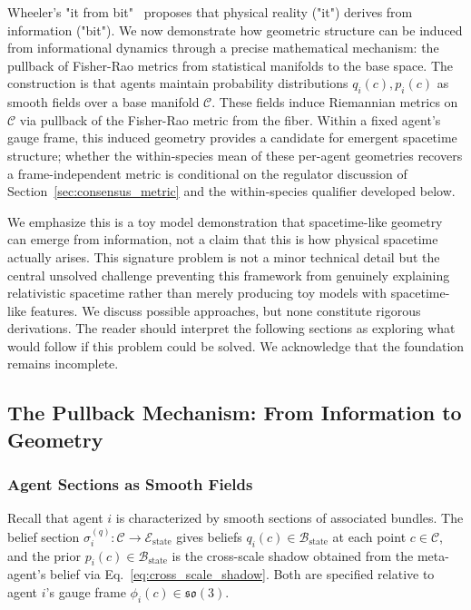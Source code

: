 \documentclass[11pt]{article}
\begin{document}
Wheeler's "it from bit"~\cite{Wheeler1990} proposes that physical reality ("it") derives from information ("bit"). We now demonstrate how geometric structure can be induced from informational dynamics through a precise mathematical mechanism: the pullback of Fisher-Rao metrics from statistical manifolds to the base space. The construction is that agents maintain probability distributions $q_i(c), p_i(c)$ as smooth fields over a base manifold $\mathcal{C}$. These fields induce Riemannian metrics on $\mathcal{C}$ via pullback of the Fisher-Rao metric from the fiber. Within a fixed agent's gauge frame, this induced geometry provides a candidate for emergent spacetime structure; whether the within-species mean of these per-agent geometries recovers a frame-independent metric is conditional on the regulator discussion of Section~\ref{sec:consensus_metric} and the within-species qualifier developed below.

We emphasize this is a toy model demonstration that spacetime-like geometry can emerge from information, not a claim that this is how physical spacetime actually arises. This signature problem is not a minor technical detail but the central unsolved challenge preventing this framework from genuinely explaining relativistic spacetime rather than merely producing toy models with spacetime-like features. We discuss possible approaches, but none constitute rigorous derivations. The reader should interpret the following sections as exploring what would follow if this problem could be solved. We acknowledge that the foundation remains incomplete.

\subsection{The Pullback Mechanism: From Information to Geometry}

\subsubsection{Agent Sections as Smooth Fields}

Recall that agent $i$ is characterized by smooth sections of associated bundles. The belief section $\sigma_i^{(q)}: \mathcal{C} \to \mathcal{E}_{\mathrm{state}}$ gives beliefs $q_i(c) \in \mathcal{B}_{\mathrm{state}}$ at each point $c \in \mathcal{C}$, and the prior $p_i(c) \in \mathcal{B}_{\mathrm{state}}$ is the cross-scale shadow obtained from the meta-agent's belief via Eq.~\eqref{eq:cross_scale_shadow}. Both are specified relative to agent $i$'s gauge frame $\phi_i(c) \in \mathfrak{so}(3)$.
\end{document}
